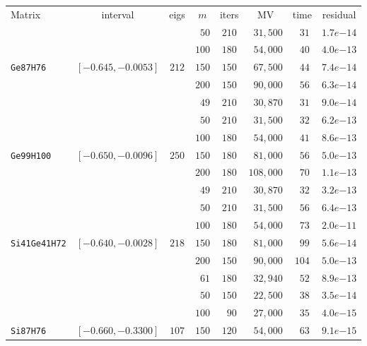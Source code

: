 \begin{tabular}{l|c|c|c|c|c|c|c}
\hline
\multirow{2}{*}{Matrix} & \multirow{2}{*}{interval} & \multirow{2}{*}{eigs} & \multirow{2}{*}{$m$} & \multirow{2}{*}{iters} & \multirow{2}{*}{MV} & \multirow{2}{*}{time} & \multirow{2}{*}{residual} \\
 & & & & & & & \\\hline
\hline
 & & & $\phantom{0}50$ & $210$ & $\phantom{0}31,500$ & $\phantom{0}31$ & $1.7e{-14}$ \\
 & & & $100$ & $180$ & $\phantom{0}54,000$ & $\phantom{0}40$ & $4.0e{-13}$ \\
\verb|Ge87H76| & $[-0.645,-0.0053]$ & $212$ & $150$ & $150$ & $\phantom{0}67,500$ & $\phantom{0}44$ & $7.4e{-14}$ \\
 & & & $200$ & $150$ & $\phantom{0}90,000$ & $\phantom{0}56$ & $6.3e{-14}$ \\
 & & & $\phantom{0}49$ & $210$ & $\phantom{0}30,870$ & $\phantom{0}31$ & $9.0e{-14}$ \\\hline
 & & & $\phantom{0}50$ & $210$ & $\phantom{0}31,500$ & $\phantom{0}32$ & $6.2e{-13}$ \\
 & & & $100$ & $180$ & $\phantom{0}54,000$ & $\phantom{0}41$ & $8.6e{-13}$ \\
\verb|Ge99H100| & $[-0.650,-0.0096]$ & $250$ & $150$ & $180$ & $\phantom{0}81,000$ & $\phantom{0}56$ & $5.0e{-13}$ \\
 & & & $200$ & $180$ & $108,000$ & $\phantom{0}70$ & $1.1e{-13}$ \\
 & & & $\phantom{0}49$ & $210$ & $\phantom{0}30,870$ & $\phantom{0}32$ & $3.2e{-13}$ \\\hline
 & & & $\phantom{0}50$ & $210$ & $\phantom{0}31,500$ & $\phantom{0}56$ & $6.4e{-13}$ \\
 & & & $100$ & $180$ & $\phantom{0}54,000$ & $\phantom{0}73$ & $2.0e{-11}$ \\
\verb|Si41Ge41H72| & $[-0.640,-0.0028]$ & $218$ & $150$ & $180$ & $\phantom{0}81,000$ & $\phantom{0}99$ & $5.6e{-14}$ \\
 & & & $200$ & $150$ & $\phantom{0}90,000$ & $104$ & $5.0e{-13}$ \\
 & & & $\phantom{0}61$ & $180$ & $\phantom{0}32,940$ & $\phantom{0}52$ & $8.9e{-13}$ \\\hline
 & & & $\phantom{0}50$ & $150$ & $\phantom{0}22,500$ & $\phantom{0}38$ & $3.5e{-14}$ \\
 & & & $100$ & $\phantom{0}90$ & $\phantom{0}27,000$ & $\phantom{0}35$ & $4.0e{-15}$ \\
\verb|Si87H76| & $[-0.660,-0.3300]$ & $107$ & $150$ & $120$ & $\phantom{0}54,000$ & $\phantom{0}63$ & $9.1e{-15}$ \\

\end{tabular}
